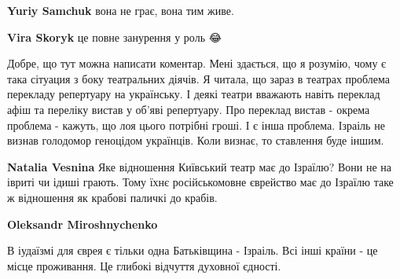 \begin{itemize}
\begin{itemize}
\textbf{Yuriy Samchuk} вона не грає, вона тим живе.

 
\textbf{Vira Skoryk} це повне занурення у роль 😂
\end{itemize}

 

Добре, що тут можна написати коментар. Мені здається, що я розумію, чому є така
сітуация з боку театральних діячів. Я читала, що зараз в театрах проблема
перекладу репертуару на українську. І деякі театри вважають навіть переклад
афіш та переліку вистав у об'яві репертуару. Про переклад вистав - окрема
проблема - кажуть, що лоя цього потрібні гроші. І є інша проблема. Ізраіль не
визнав голодомор геноцідом українців. Коли визнає, то ставлення буде іншим.

\begin{itemize}
 
\textbf{Natalia Vesnina} Яке відношення Київський театр має до Ізраїлю? Вони не
на івриті чи ідиші грають. Тому їхнє російськомовне єврейство має до Ізраїлю
таке ж відношення як крабові паличкі до крабів.

\begin{itemize}
 
\textbf{Oleksandr Miroshnychenko} 

В іудаїзмі для єврея є тільки одна Батьківщина - Ізраіль. Всі інші країни - це
місце проживання. Це глибокі відчуття духовної єдності.


 

\end{itemize}
\end{itemize}
\end{itemize}
